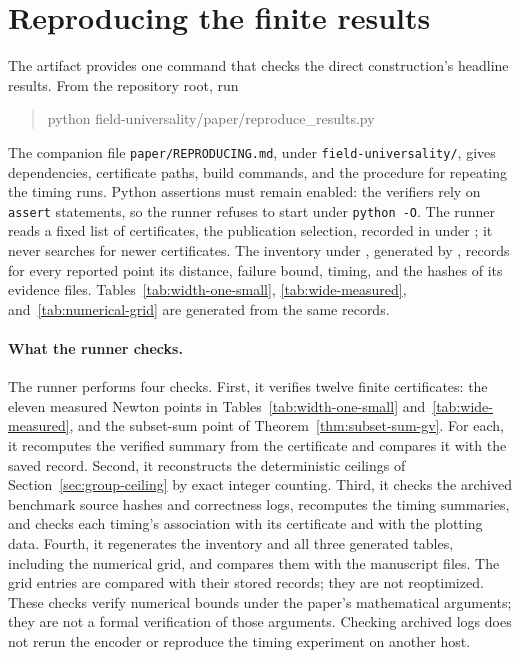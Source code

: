 \section{Reproducing the finite results}\label{app:reproduction}

The artifact provides one command that checks the direct construction's
headline results. From the repository root, run
\begin{quote}
\small\ttfamily
python field-universality/paper/reproduce\_results.py
\end{quote}
The companion file \texttt{paper/REPRODUCING.md}, under
\texttt{field-universality/}, gives dependencies, certificate paths,
build commands, and the procedure for repeating the timing runs.
Python assertions must remain enabled: the verifiers rely on
\texttt{assert} statements, so the runner refuses to start under
\texttt{python -O}. The runner reads a fixed list of certificates, the
publication selection, recorded in
 under
; it never searches for newer
certificates. The inventory  under
, generated by
, records for every
reported point its distance, failure bound, timing, and the hashes of
its evidence files. Tables~\ref{tab:width-one-small},
\ref{tab:wide-measured}, and~\ref{tab:numerical-grid} are generated
from the same records.

\paragraph{What the runner checks.}
The runner performs four checks. First, it verifies twelve finite
certificates: the eleven measured Newton points in
Tables~\ref{tab:width-one-small} and~\ref{tab:wide-measured}, and the
subset-sum point of Theorem~\ref{thm:subset-sum-gv}. For each, it
recomputes the verified summary from the certificate and compares it
with the saved record. Second, it reconstructs the deterministic
ceilings of Section~\ref{sec:group-ceiling} by exact integer counting.
Third, it checks the archived benchmark source hashes and correctness
logs, recomputes the timing summaries, and checks each timing's
association with its certificate and with the plotting data. Fourth,
it regenerates the inventory and all three generated tables, including
the numerical grid, and compares them with the manuscript files. The
grid entries are compared with their stored records; they are not
reoptimized. These checks verify numerical bounds under the paper's
mathematical arguments; they are not a formal verification of those
arguments. Checking archived logs does not rerun the encoder or
reproduce the timing experiment on another host.


